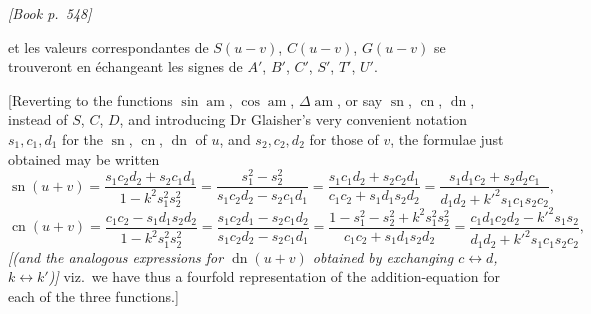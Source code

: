 \documentclass[11pt]{article}
\begin{document}
\medskip
\noindent\textit{[Book p.~548]}\hfill

\smallskip

\noindent et les valeurs correspondantes de $S(u - v)$, $C(u - v)$, $G(u - v)$ se trouveront en \'echangeant les signes de $A'$, $B'$, $C'$, $S'$, $T'$, $U'$.

\smallskip

[Reverting to the functions $\sin\operatorname{am}$, $\cos\operatorname{am}$, $\Delta\operatorname{am}$, or say $\operatorname{sn}$, $\operatorname{cn}$, $\operatorname{dn}$, instead of $S$, $C$, $D$, and introducing Dr Glaisher's very convenient notation $s_{1}, c_{1}, d_{1}$ for the $\operatorname{sn}$, $\operatorname{cn}$, $\operatorname{dn}$ of $u$, and $s_{2}, c_{2}, d_{2}$ for those of $v$, the formulae just obtained may be written
\[
\operatorname{sn}(u + v) = \frac{s_{1}c_{2}d_{2} + s_{2}c_{1}d_{1}}{1 - k^{2}s_{1}^{2}s_{2}^{2}} = \frac{s_{1}^{2} - s_{2}^{2}}{s_{1}c_{2}d_{2} - s_{2}c_{1}d_{1}} = \frac{s_{1}c_{1}d_{2} + s_{2}c_{2}d_{1}}{c_{1}c_{2} + s_{1}d_{1}s_{2}d_{2}} = \frac{s_{1}d_{1}c_{2} + s_{2}d_{2}c_{1}}{d_{1}d_{2} + k'^{2}s_{1}c_{1}s_{2}c_{2}},
\]
\[
\operatorname{cn}(u + v) = \frac{c_{1}c_{2} - s_{1}d_{1}s_{2}d_{2}}{1 - k^{2}s_{1}^{2}s_{2}^{2}} = \frac{s_{1}c_{2}d_{1} - s_{2}c_{1}d_{2}}{s_{1}c_{2}d_{2} - s_{2}c_{1}d_{1}} = \frac{1 - s_{1}^{2} - s_{2}^{2} + k^{2}s_{1}^{2}s_{2}^{2}}{c_{1}c_{2} + s_{1}d_{1}s_{2}d_{2}} = \frac{c_{1}d_{1}c_{2}d_{2} - k'^{2}s_{1}s_{2}}{d_{1}d_{2} + k'^{2}s_{1}c_{1}s_{2}c_{2}},
\]
\textit{[(and the analogous expressions for $\operatorname{dn}(u+v)$ obtained by exchanging $c \leftrightarrow d$, $k \leftrightarrow k'$)]} viz.\ we have thus a fourfold representation of the addition-equation for each of the three functions.]

\medskip
\end{document}

